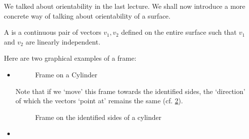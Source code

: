 \documentclass[notoc,notitlepage]{tufte-book}
\begin{document}
We talked about orientability in the last lecture. We shall now introduce a more concrete
way of talking about orientability of a surface.

\begin{defn}[Frame]\label{defn:frame}
  A  is a continuous pair of vectors $v_1, v_2$ defined on the entire
  surface such that $v_1$ and $v_2$ are linearly independent.
\end{defn}

\begin{eg}
  Here are two graphical examples of a frame:
  \begin{itemize}
    \item {}
      \begin{figure}[ht]
        \centering
        \caption{Frame on a Cylinder}
        \label{fig:frame_on_a_cylinder}
      \end{figure}

      Note that if we `move' this frame towards the identified sides, the `direction' of
      which the vectors `point at' remains the same (cf.
      \cref{fig:frame_on_the_identified_sides_of_a_cylinder}).
      \begin{figure}[ht]
        \centering
        \caption{Frame on the identified sides of a cylinder}
        \label{fig:frame_on_the_identified_sides_of_a_cylinder}
      \end{figure}

    \item {}
      \begin{figure}[ht]
        \centering
\end{figure}
\end{itemize}
\end{eg}
\end{document}
